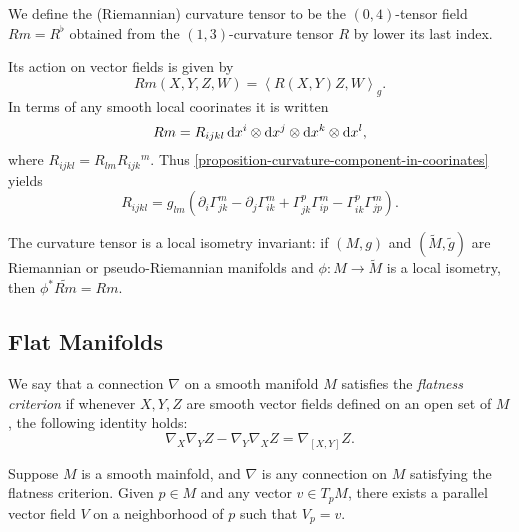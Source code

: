 \begin{definition}
  \label{definition-Riemannian-curvature-tensor}
  We define the (Riemannian) curvature tensor to be the \( (0, 4) \)-tensor field \( Rm = R^{\flat} \) obtained from the \( (1, 3) \)-curvature tensor \( R \) by lower its last index.
\end{definition}
\begin{remark}
  \label{remark-Riemannian-curvature-tensor}
  Its action on vector fields is given by
  \[
    Rm(X, Y, Z, W) = \left\langle R(X, Y) Z, W \right\rangle_g.
  \]
  In terms of any smooth local coorinates it is written
  \[
    Rm = R_{ijkl} \mathop{}\!\mathrm{d} x^i \otimes \mathop{}\!\mathrm{d} x^j \otimes \mathop{}\!\mathrm{d} x^k \otimes \mathop{}\!\mathrm{d} x^l,
  \]
  where \( R_{ijkl} = R_{lm} R_{ijk}{}^m \).
  Thus \ref{proposition-curvature-component-in-coorinates} yields
  \[
    R_{ijkl} = g_{lm} (\partial_i \Gamma^m_{jk} - \partial_j \Gamma^m_{ik} + \Gamma_{jk}^p \Gamma^m_{ip} - \Gamma^p_{ik} \Gamma_{jp}^m).
  \]
\end{remark}

\begin{proposition}
  \label{proposition-curvature-local-isometry-invariant}
  The curvature tensor is a local isometry invariant: if \( (M, g) \) and \( (\widetilde{M}, \widetilde{g}) \) are Riemannian or pseudo-Riemannian manifolds and \( \phi: M \to \widetilde{M} \) is a local isometry, then \( \phi^* \widetilde{Rm} = Rm \).
\end{proposition}

\subsection{Flat Manifolds}
\label{subsection-flat-manifolds}

\begin{definition}
  \label{definition-flatness-criterion}
  We say that a connection \( \nabla \) on a smooth manifold \( M \) satisfies the \emph{flatness criterion} if whenever \( X, Y, Z \) are smooth vector fields defined on an open set of \( M \), the following identity holds:
  \[
    \nabla_X \nabla_Y Z - \nabla_Y \nabla_X Z = \nabla_{[X, Y]}Z.
  \]
\end{definition}

\begin{lemma}
  \label{lemma-paralle-vector-field-at-a-point}
  Suppose \( M \) is a smooth mainfold, and \( \nabla \) is any connection on \( M \) satisfying the flatness criterion.
  Given \( p \in M \) and any vector \( v \in T_p M \), there exists a parallel vector field \( V \) on a neighborhood of \( p \) such that \( V_p = v \).
\end{lemma}

